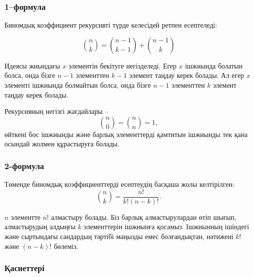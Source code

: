 \subsubsection{1–формула}

Биномдық коэффициент рекурсивті түрде 
келесідей ретпен есептеледі:

\[
{n \choose k}  =  {n-1 \choose k-1} + {n-1 \choose k}
\]

Идеясы жиындағы $x$ элементін бекітуге негізделеді. 
Егер $x$ ішжиында болатын болса, 
онда бізге $n-1$ элементтен $k-1$ элемент
таңдау керек болады. Ал егер $x$ элементі
ішжиында болмайтын болса, онда бізге $n-1$
элементтен $k$ элемент таңдау керек болады.


Рекурсияның негізгі жағдайлары --
\[
{n \choose 0}  =  {n \choose n} = 1,
\]
өйткені бос ішжиынды және барлық элементтерді 
қамтитын ішжиынды тек қана осындай жолмен құрастыруға болады. 

\subsubsection{2-формула}

Төменде биномдық коэффициенттерді есептеудің басқаша жолы келтірілген:
\[
{n \choose k}  =  \frac{n!}{k!(n-k)!}.
\]

$n$ элементте $n!$ алмастыру болады. 
Біз барлық алмастырулардан өтіп шығып, 
алмастырудың алдыңғы $k$ элементтерін 
ішжиынға қосамыз. Ішжиынның ішіндегі және 
сыртындағы сандардың тәртібі маңызды емес
болғандықтан, нәтижені $k!$ және $(n-k)!$ бөлеміз. 


\subsubsection{Қасиеттері}

